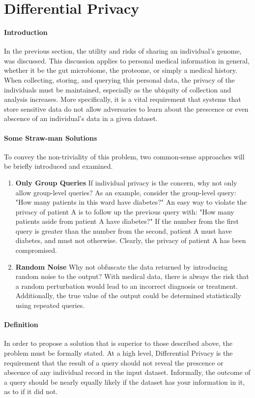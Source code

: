 \section{Differential Privacy}

\paragraph{Introduction}
In the previous section, the utility and risks of sharing an individual's genome, was discussed. This discussion applies to personal medical information in general, whether it be the gut microbiome, the proteome, or simply a medical history. When collecting, storing, and querying this personal data, the privacy of the individuals must be maintained, especially as the ubiquity of collection and analysis increases. More specifically, it is a vital requirement that systems that store sensitive data do not allow adversaries to learn about the prescence or even abscence of an individual's data in a given dataset.

\paragraph{Some Straw-man Solutions}
To convey the non-triviality of this problem, two common-sense approaches will be briefly introduced and examined.

\begin{enumerate}
\item \textbf{Only Group Queries} If individual privacy is the concern, why not only allow group-level queries? As an example, consider the group-level query: "How many patients in this ward have diabetes?" An easy way to violate the privacy of patient A is to follow up the previous query with: "How many patients aside from patient A have diabetes?" If the number from the first query is greater than the number from the second, patient A must have diabetes, and must not otherwise. Clearly, the privacy of patient A has been compromised.
\item \textbf{Random Noise} Why not obfuscate the data returned by introducing random noise to the output? With medical data, there is always the risk that a random perturbation would lead to an incorrect diagnosis or treatment. Additionally, the true value of the output could be determined statistically using repeated queries.
\end{enumerate}

\paragraph{Definition}
In order to propose a solution that is superior to those described above, the problem must be formally stated. At a high level, Differential Privacy is the requirement that the result of a query should not reveal the prescence or abscence of any individual record in the input dataset. Informally, the outcome of a query should be nearly equally likely if the dataset has your information in it, as to if it did not.

